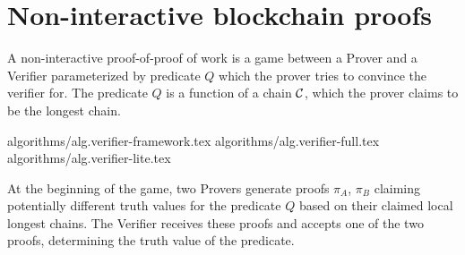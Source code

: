 \section{Non-interactive blockchain proofs}

A non-interactive proof-of-proof of work is a game between a Prover and a
Verifier parameterized by predicate $Q$ which the prover tries to convince the
verifier for. The predicate $Q$ is a function of a chain $\mathcal{C}$, which the
prover claims to be the longest chain.

{algorithms/alg.verifier-framework.tex}
{algorithms/alg.verifier-full.tex}
{algorithms/alg.verifier-lite.tex}

At the beginning of the game, two Provers generate proofs $\pi_A$, $\pi_B$
claiming potentially different truth values for the predicate $Q$ based on
their claimed local longest chains. The Verifier receives these proofs and
accepts one of the two proofs, determining the truth value of the predicate.
